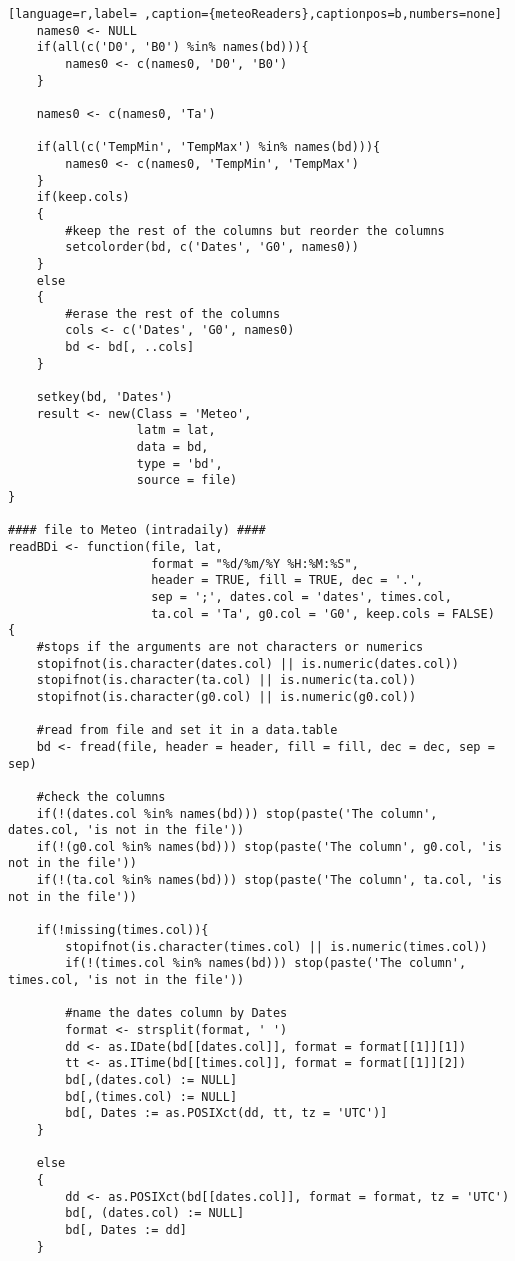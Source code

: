 \begin{lstlisting}[language=r,label= ,caption={meteoReaders},captionpos=b,numbers=none]
    names0 <- NULL
    if(all(c('D0', 'B0') %in% names(bd))){
        names0 <- c(names0, 'D0', 'B0')
    }

    names0 <- c(names0, 'Ta')

    if(all(c('TempMin', 'TempMax') %in% names(bd))){
        names0 <- c(names0, 'TempMin', 'TempMax')
    }
    if(keep.cols)
    {
        #keep the rest of the columns but reorder the columns
        setcolorder(bd, c('Dates', 'G0', names0))
    }
    else
    {
        #erase the rest of the columns
        cols <- c('Dates', 'G0', names0)
        bd <- bd[, ..cols]
    }

    setkey(bd, 'Dates')
    result <- new(Class = 'Meteo',
                  latm = lat,
                  data = bd,
                  type = 'bd',
                  source = file)
}

#### file to Meteo (intradaily) ####
readBDi <- function(file, lat,
                    format = "%d/%m/%Y %H:%M:%S",
                    header = TRUE, fill = TRUE, dec = '.',
                    sep = ';', dates.col = 'dates', times.col,
                    ta.col = 'Ta', g0.col = 'G0', keep.cols = FALSE)
{
    #stops if the arguments are not characters or numerics
    stopifnot(is.character(dates.col) || is.numeric(dates.col))
    stopifnot(is.character(ta.col) || is.numeric(ta.col))
    stopifnot(is.character(g0.col) || is.numeric(g0.col))

    #read from file and set it in a data.table
    bd <- fread(file, header = header, fill = fill, dec = dec, sep = sep)

    #check the columns
    if(!(dates.col %in% names(bd))) stop(paste('The column', dates.col, 'is not in the file'))
    if(!(g0.col %in% names(bd))) stop(paste('The column', g0.col, 'is not in the file'))
    if(!(ta.col %in% names(bd))) stop(paste('The column', ta.col, 'is not in the file'))

    if(!missing(times.col)){
        stopifnot(is.character(times.col) || is.numeric(times.col))
        if(!(times.col %in% names(bd))) stop(paste('The column', times.col, 'is not in the file'))

        #name the dates column by Dates
        format <- strsplit(format, ' ')
        dd <- as.IDate(bd[[dates.col]], format = format[[1]][1])
        tt <- as.ITime(bd[[times.col]], format = format[[1]][2])
        bd[,(dates.col) := NULL]
        bd[,(times.col) := NULL]
        bd[, Dates := as.POSIXct(dd, tt, tz = 'UTC')]
    }

    else
    {
        dd <- as.POSIXct(bd[[dates.col]], format = format, tz = 'UTC')
        bd[, (dates.col) := NULL]
        bd[, Dates := dd]
    }


\end{lstlisting}
